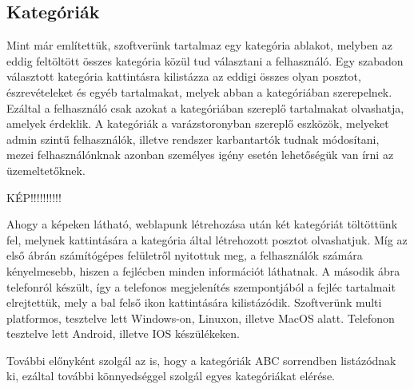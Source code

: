 \documentclass[
]{thesis-ekf}
\theoremstyle{definition}
\theoremstyle{remark}
\begin{document}
		\subsection{Kategóriák}
			\par Mint már említettük, szoftverünk tartalmaz egy kategória ablakot, melyben az eddig feltöltött összes kategória közül tud választani a felhasználó. Egy szabadon választott kategória kattintásra kilistázza az eddigi összes olyan posztot, észrevételeket és egyéb tartalmakat, melyek abban a kategóriában szerepelnek.  Ezáltal a felhasználó csak azokat a kategóriában szereplő tartalmakat olvashatja, amelyek érdeklik. A kategóriák a varázstoronyban szereplő eszközök, melyeket admin szintű felhasználók, illetve rendszer karbantartók tudnak módosítani, mezei felhasználónknak azonban személyes igény esetén lehetőségük van írni az üzemeltetőknek.
			\par KÉP!!!!!!!!!!
			\par Ahogy a képeken látható, weblapunk létrehozása után két kategóriát töltöttünk fel, melynek kattintására a kategória által létrehozott posztot olvashatjuk. Míg az első ábrán számítógépes felületről nyitottuk meg, a felhasználók számára kényelmesebb, hiszen a fejlécben minden információt láthatnak. A második ábra telefonról készült, így a telefonos megjelenítés szempontjából a fejléc tartalmait elrejtettük, mely a bal felső ikon kattintására kilistázódik. Szoftverünk multi platformos, tesztelve lett Windows-on, Linuxon, illetve MacOS alatt. Telefonon tesztelve lett Android, illetve IOS készülékeken.
			\par További előnyként szolgál az is, hogy a kategóriák ABC sorrendben listázódnak ki, ezáltal további könnyedséggel szolgál egyes kategóriákat elérése.
\end{document}
